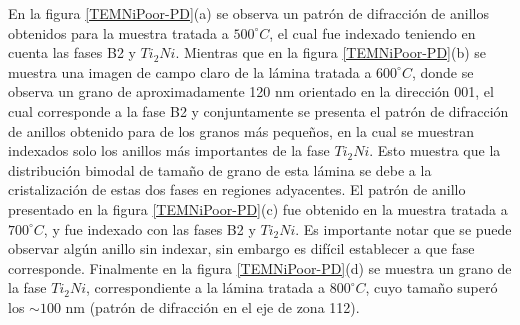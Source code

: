 \documentclass[12pt]{article}
\theoremstyle{definition}
\theoremstyle{remark}
\begin{document}
{En la figura \ref{TEMNiPoor-PD}(a) se observa un patrón de difracción de anillos obtenidos para la muestra tratada a $500 ^\circ C$, el cual fue indexado teniendo en cuenta las fases B2 y $Ti_2Ni$. Mientras que en la figura \ref{TEMNiPoor-PD}(b) se muestra una imagen de campo claro de la lámina tratada a $600 ^\circ C$, donde se observa un grano de aproximadamente 120 nm orientado en la dirección 001, el cual corresponde a la fase B2 y conjuntamente se presenta el patrón de difracción de anillos obtenido para de los granos más pequeños, en la cual se muestran indexados solo los anillos más importantes de la fase $Ti_2 Ni$. Esto muestra que la distribución bimodal de tamaño de grano de esta lámina se debe a la cristalización de estas dos fases en regiones adyacentes. El patrón de anillo presentado en la figura \ref{TEMNiPoor-PD}(c) fue obtenido en la muestra tratada a $700 ^\circ C$, y fue  indexado con las fases B2 y $Ti_2Ni$. Es importante notar que se puede observar algún anillo sin indexar, sin embargo es difícil establecer a que fase corresponde. Finalmente en la figura \ref{TEMNiPoor-PD}(d) se muestra un grano de la fase $Ti_2Ni$, correspondiente a la lámina tratada a $800 ^\circ C$, cuyo tamaño superó los $\sim 100$ nm (patrón de difracción en el eje de zona 112).

}
\end{document}
